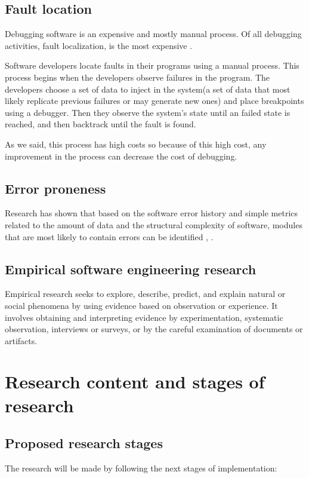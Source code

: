 \documentclass[12pt]{mitthesis}
\begin{document}
\section{Fault location}
Debugging software is an expensive and mostly manual process. Of all debugging activities, fault localization, is the most expensive \cite{articleDebugging}. 

Software developers locate faults in their programs using a manual process. This process begins when the developers observe failures in the program. The developers choose a set of data to inject in the system(a set of data that most likely replicate previous failures or may generate new ones) and place breakpoints using a debugger. Then they observe the system's state until an failed state is reached, and then backtrack until the fault is found. 

As we said, this process has high costs so because of this high cost, any improvement in the process can decrease the cost of debugging.\cite{fault-localization} \cite{program-failures}


\section{Error proneness}
Research has shown that based on the software error history and simple metrics related to the amount of data and the structural complexity of software,
modules that are most likely to contain errors can be identified \cite{67595}, \cite{1702015}.


\section{Empirical software engineering research}
Empirical research seeks to explore, describe, predict, and explain natural or social phenomena by using evidence based on observation or experience.
It involves obtaining and interpreting evidence by experimentation, systematic observation, interviews or surveys, or by the careful examination of documents or artifacts. \cite{inproceedingsEmpirical}



\chapter{Research content and stages of research}

\section{Proposed research stages}
The research will be made by following the next stages of implementation:\\
\end{document}
